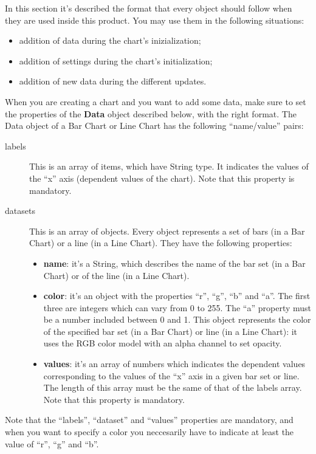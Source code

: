 	In this section it's described the format that every  object should follow when they are used inside this product. You may use them in the following situations:
	\begin{itemize}
		\item addition of data during the chart's inizialization;
		\item addition of settings during the chart's initialization;
		\item addition of new data during the different updates.
	\end{itemize}

		When you are creating a chart and you want to add some data, make sure to set the properties of the \textbf{Data} object described below, with the right format.
		 \label{sec:dataBarLine}
			The Data object of a Bar Chart or Line Chart has the following “name/value” pairs:
			\begin{description}
				\item[labels] This is an array of items, which have String type. It indicates the values of the “x” axis (dependent values of the chart). Note that this property is mandatory.
				\item[datasets] This is an array of objects. Every object represents a set of bars (in a Bar Chart) or a line (in a Line Chart). They have the following properties: 
				\begin{itemize}
					\item \textbf{name}: it's a String, which describes the name of the bar set (in a Bar Chart) or of the line (in a Line Chart). 
					\item \textbf{color}: it's an object with the properties “r”, “g”, “b” and “a”. The first three are integers which can vary from 0 to 255. The “a” property must be a number included between 0 and 1. This object represents the color of the specified bar set (in a Bar Chart) or line (in a Line Chart): it uses the RGB color model with an alpha channel to set opacity.
					\item \textbf{values}: it's an array of numbers which indicates the dependent values corresponding to the values of the “x” axis in a given bar set or line. The length of this array must be the same of that of the labels array. Note that this property is mandatory.
				\end{itemize}
			\end{description}
			Note that the “labels”, “dataset” and “values” properties are mandatory, and when you want to specify a color you neccesarily have to indicate at least the value of “r”, “g” and “b”.
